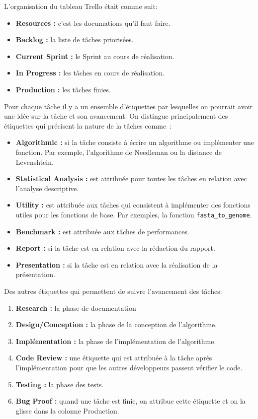\documentclass[12pt]{article}
\begin{document}
L'organisation du tableau Trello était comme suit:
\begin{itemize}
    \item \textbf{Resources :} c'est les documations qu'il faut faire.
    \item \textbf{Backlog :} la liste de tâches priorisées.
    \item \textbf{Current Sprint :} le Sprint au cours de réalisation.
    \item \textbf{In Progress :} les tâches en cours de réalisation.
    \item \textbf{Production :} les tâches finies.
\end{itemize}
Pour chaque tâche il y a un ensemble d'étiquettes par lesquelles on pourrait avoir une idée sur la tâche et son avancement.
On distingue principalement des étiquettes qui précisent la nature de la tâches comme~:
\begin{itemize}
    \item \textbf{Algorithmic :} si la tâche consiste à écrire un algorithme ou implémenter une fonction. Par exemple, l'algorithme de Needleman ou la distance de Levenshtein.
    \item \textbf{Statistical Analysis :} est attribuée pour toutes les tâches en relation avec l'analyse descriptive.
    \item \textbf{Utility :} est attribuée aux tâches qui consistent à implémenter des fonctions utiles pour les fonctions de base. Par exemples, la fonction \texttt{fasta\_to\_genome}.
    \item \textbf{Benchmark :} est attribuée aux tâches de performances.
    \item \textbf{Report :} si la tâche est en relation avec la rédaction du rapport.
    \item \textbf{Presentation :} si la tâche est en relation avec la réalisation de la présentation.
\end{itemize}
Des autres étiquettes qui permettent de suivre l'avancement des tâches:
\begin{enumerate}
    \item \textbf{Research :} la phase de documentation 
    \item \textbf{Design/Conception :} la phase de la conception de l'algorithme.
    \item \textbf{Implémentation :} la phase de l'implémentation de l'algorithme.
    \item \textbf{Code Review :} une étiquette qui est attribuée à la tâche après l'implémentation pour que les autres développeurs passent vérifier le code.
    \item \textbf{Testing :} la phase des tests.
    \item \textbf{Bug Proof :} quand une tâche est finie, on attribue cette étiquette et on la glisse dans la colonne Production.
\end{enumerate}
\end{document}
